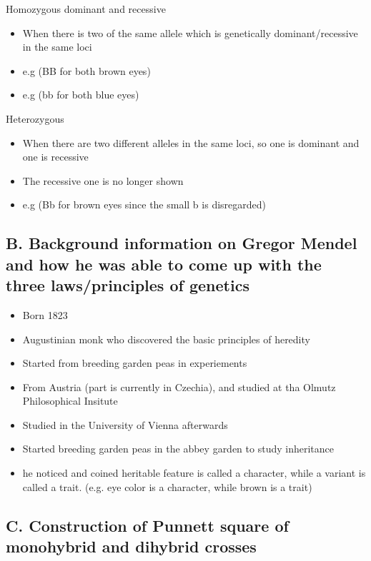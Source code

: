 \documentclass{article}
\begin{document}
Homozygous dominant and recessive
\begin{itemize}
    \item When there is two of the same allele which is genetically dominant/recessive in the same loci
    \item e.g (BB for both brown eyes)
    \item e.g (bb for both blue eyes)
\end{itemize}

Heterozygous
\begin{itemize}
    \item When there are two different alleles in the same loci, so one is dominant and one is recessive
    \item The recessive one is no longer shown
    \item e.g (Bb for brown eyes since the small b is disregarded)
\end{itemize}


\subsection*{B. Background information on Gregor Mendel and how he was able to come up with the three laws/principles of genetics}

\begin{itemize}
    \item Born 1823
    \item Augustinian monk who discovered the basic principles of heredity
    \item Started from breeding garden peas in experiements
    \item From Austria (part is currently in Czechia), and studied at tha Olmutz Philosophical Insitute
    \item Studied in the University of Vienna afterwards
    \item Started breeding garden peas in the abbey garden to study inheritance
    \item he noticed and coined heritable feature is called a character, while a variant is called a trait. (e.g. eye color is a character, while brown is a trait)
    
\end{itemize}
\subsection*{C. Construction of Punnett square of monohybrid and dihybrid crosses}
\end{document}
